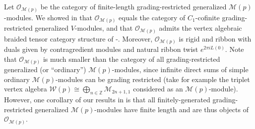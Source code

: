 \documentclass[11pt, reqno]{amsart}
\theoremstyle{definition}\newtheorem{defi}[thm]{Definition}
\theoremstyle{definition}\newtheorem{rem}[thm]{Remark}
\theoremstyle{definition}\newtheorem{exam}[thm]{Example}
\theoremstyle{definition}\newtheorem{assum}[thm]{Assumption}
\newcommand{\cM}{\mathcal{M}}
\newcommand{\cO}{\mathcal{O}}
\newcommand{\cW}{\mathcal{W}}
\newcommand{\ZZ}{\mathbb{Z}}
\begin{document}
Let $\cO_{\cM(p)}$ be the category of finite-length grading-restricted generalized $\cM(p)$-modules. We showed in \cite{CMY-singlet-typical} that $\cO_{\cM(p)}$ equals the category of $C_1$-cofinite grading-restricted generalized $V$-modules, and that $\cO_{\cM(p)}$ admits the vertex algebraic braided tensor category structure of \cite{HLZ1}-\cite{HLZ8}. Moreover, $\cO_{\cM(p)}$ is rigid and ribbon with duals given by contragredient modules and natural ribbon twist $e^{2\pi i L(0)}$. Note that $\cO_{\cM(p)}$ is much smaller than the category of all grading-restricted generalized (or ``ordinary'') $\cM(p)$-modules, since infinite direct sums of simple ordinary $\cM(p)$-modules can be grading restricted (take for example the triplet vertex algebra $\cW(p)\cong\bigoplus_{n\in\ZZ} \cM_{2n+1,1}$ considered as an $\cM(p)$-module). However, one corollary of our results in \cite{CMY-singlet-typical} is that all finitely-generated grading-restricted generalized $\cM(p)$-modules have finite length and are thus objects of $\cO_{\cM(p)}$.
\end{document}
